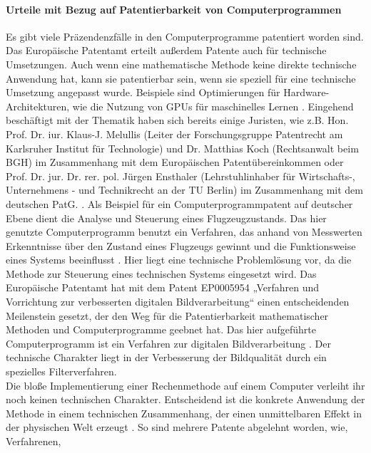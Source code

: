 \paragraph{Urteile mit Bezug auf Patentierbarkeit von Computerprogrammen}
Es gibt viele Präzendenzfälle in den Computerprogramme patentiert worden sind.
Das Europäische Patentamt erteilt außerdem Patente auch für technische Umsetzungen.
Auch wenn eine mathematische Methode keine direkte technische Anwendung hat, 
kann sie patentierbar sein, 
wenn sie speziell für eine technische Umsetzung angepasst wurde. 
Beispiele sind Optimierungen für Hardware-Architekturen, 
wie die Nutzung von GPUs für maschinelles Lernen \cite{MathematischeMethoden}. 
Eingehend beschäftigt mit der Thematik haben sich bereits einige Juristen,
wie z.B. 
Hon. Prof. Dr. iur. Klaus-J. Melullis
(Leiter der Forschungsgruppe Patentrecht am Karlsruher Institut für Technologie) und 
Dr. Matthias Koch (Rechtsanwalt beim BGH)\cite{melullisEPUArt522023} im Zusammenhang 
mit dem Europäischen Patentübereinkommen 
oder Prof. Dr. jur. Dr. rer. pol. Jürgen Ensthaler 
(Lehrstuhlinhaber für Wirtschafts-, Unternehmens - und Technikrecht an der TU Berlin)
im Zusammenhang mit dem deutschen PatG.
\cite{ensthalerEnsthalerBegrenzungPatentierung2013}.
Als Beispiel für ein Computerprogrammpatent auf deutscher 
Ebene dient die Analyse 
und Steuerung eines Flugzeugzustands.
Das hier genutzte Computerprogramm benutzt ein Verfahren, 
das anhand von Messwerten Erkenntnisse 
über den Zustand eines Flugzeugs gewinnt und 
die Funktionsweise eines Systems beeinflusst 
\cite{BGH3020152015}.
Hier liegt eine technische Problemlösung vor, 
da die Methode zur Steuerung eines technischen Systems eingesetzt wird.
Das Europäische Patentamt hat mit dem Patent EP0005954 
„Verfahren und Vorrichtung zur verbesserten digitalen Bildverarbeitung“ 
einen entscheidenden Meilenstein gesetzt, 
der den Weg für die Patentierbarkeit mathematischer Methoden und 
Computerprogramme geebnet hat.
Das hier aufgeführte Computerprogramm ist ein 
Verfahren zur digitalen Bildverarbeitung \cite{EPThisFile}.
Der technische Charakter liegt in der Verbesserung 
der Bildqualität durch ein spezielles Filterverfahren.
\\
Die bloße Implementierung einer Rechenmethode auf einem Computer 
verleiht ihr noch keinen technischen Charakter. 
Entscheidend ist die konkrete Anwendung der Methode 
in einem technischen Zusammenhang, der einen unmittelbaren Effekt in der 
physischen Welt erzeugt \cite{melullisEPUArt522023}.
So sind mehrere Patente abgelehnt worden,
wie, Verfahrenen, 
